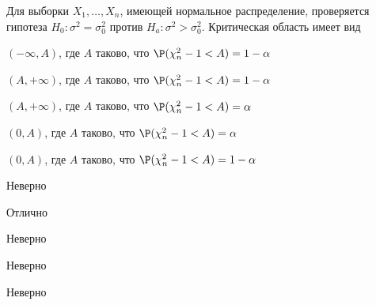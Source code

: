 
\begin{question}
Для выборки \(X_1,\ldots,X_n\), имеющей нормальное распределение,
проверяется гипотеза \(H_0: \sigma^2=\sigma_0^2\) против
\(H_a: \sigma^2 > \sigma_0^2\). Критическая область имеет вид
\begin{answerlist}
  \item \((-\infty,A)\), где \(A\) таково, что \(\P(\chi^2_n-1 < A) =1-\alpha\)
  \item \((A,+\infty)\), где \(A\) таково, что \(\P(\chi^2_n-1 < A) =1-\alpha\)
  \item \((A,+\infty)\), где \(A\) таково, что \(\P(\chi^2_n-1 < A) =\alpha\)
  \item \((0,A)\), где \(A\) таково, что \(\P(\chi^2_n-1 < A) =\alpha\)
  \item \((0,A)\), где \(A\) таково, что \(\P(\chi^2_n-1 < A) =1-\alpha\)
\end{answerlist}
\end{question}

\begin{solution}
\begin{answerlist}
  \item Неверно
  \item Отлично
  \item Неверно
  \item Неверно
  \item Неверно
\end{answerlist}
\end{solution}

